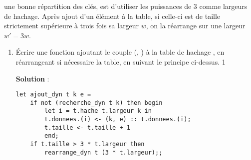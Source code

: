 \documentclass[10pt,a4paper, varwidth]{article}
\def\cor{1}
\begin{document}
	une bonne répartition des clés, est
	d'utiliser les puissances de 3 comme largeurs de hachage. Après ajout d'un élément à la table, si celle-ci est de
	taille strictement supérieure à trois fois sa largeur $w$, on la réarrange sur une largeur $w′ = 3w$.
	\begin{enumerate}[resume]
		\item Écrire une fonction  ajoutant le couple (, ) à la table de hachage , en réarrangeant si nécessaire la table, en suivant le principe ci-dessus.
		\if\cor1
        \begin{emphase}
            \textbf{Solution} : 
            \begin{center}
                \begin{minipage}{.7\textwidth}
                \begin{verbatim}
let ajout_dyn t k e =
    if not (recherche_dyn t k) then begin
        let i = t.hache t.largeur k in
        t.donnees.(i) <- (k, e) :: t.donnees.(i);
        t.taille <- t.taille + 1
        end;
    if t.taille > 3 * t.largeur then
        rearrange_dyn t (3 * t.largeur);;    
                \end{verbatim}
                \end{minipage}
            \end{center}
        \end{emphase}
        \fi
	\end{enumerate}
\end{document}
